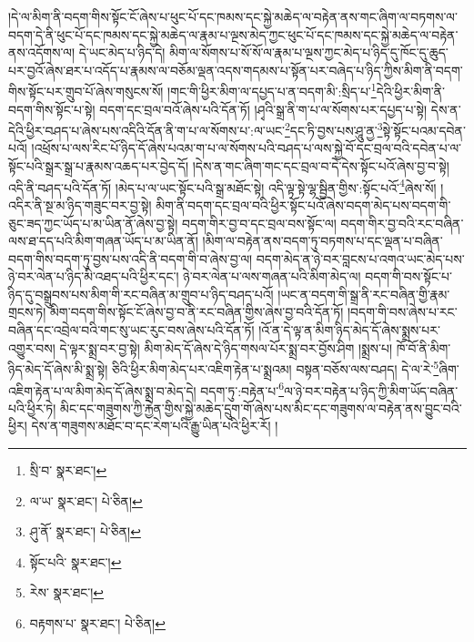 །དེ་ལ་མིག་ནི་བདག་གིས་སྟོང་ངོ་ཞེས་པ་ཕུང་པོ་དང་ཁམས་དང་སྐྱེ་མཆེད་ལ་བརྟེན་ནས་གང་ཞིག་ལ་བཏགས་ལ་བདག་དེ་ནི་ཕུང་པོ་དང་ཁམས་དང་སྐྱེ་མཆེད་ལ་རྣམ་པ་ལྔས་མེད་ཀྱང་ཕུང་པོ་དང་ཁམས་དང་སྐྱེ་མཆེད་ལ་བརྟེན་ནས་འདོགས་ལ། དེ་ཡང་མེད་པ་ཉིད་དེ། མིག་ལ་སོགས་པ་སོ་སོ་ལ་རྣམ་པ་ལྔས་ཀྱང་མེད་པ་ཉིད་དུ་ཁོང་དུ་ཆུད་པར་བྱའོ་ཞེས་ཐར་པ་འདོད་པ་རྣམས་ལ་བཅོམ་ལྡན་འདས་གདམས་པ་སྟོན་པར་བཞེད་པ་ཉིད་ཀྱིས་མིག་ནི་བདག་གིས་སྟོང་པར་གྲུབ་པོ་ཞེས་གསུངས་སོ། །གང་གི་ཕྱིར་མིག་ལ་དཔྱད་པ་ན་བདག་མི་:སྲིད་པ་\footnote{སྲི་བ་  སྣར་ཐང་། }དེའི་ཕྱིར་མིག་ནི་བདག་གིས་སྟོང་པ་སྟེ། བདག་དང་བྲལ་བའོ་ཞེས་པའི་དོན་ཏོ། །ཤྭའི་སྒྲ་ནི་ག་པ་ལ་སོགས་པར་དཔྱད་པ་སྟེ། དེས་ན་དེའི་ཕྱིར་བཤད་པ་ཞེས་པས་འདིའི་དོན་ནི་ག་པ་ལ་སོགས་པ་:ལ་ཡང་\footnote{ལ་ཡ་  སྣར་ཐང་།  པེ་ཅིན། }དང་ཏི་བྱས་པས་ཤཱུ་ནྱ་\footnote{ཤུ་ནོ་  སྣར་ཐང་།  པེ་ཅིན། }སྟེ་སྟོང་པའམ་དབེན་པའོ། །འཕྲོས་པ་ལས་རིང་པོ་ཉིད་དོ་ཞེས་པའམ་ག་པ་ལ་སོགས་པའི་བཤད་པ་ལས་སྐྱེ་བོ་དང་བྲལ་བའི་དབེན་པ་ལ་སྟོང་པའི་སྒྲར་སྒྲ་པ་རྣམས་འཆད་པར་བྱེད་དོ། །དེས་ན་གང་ཞིག་གང་དང་བྲལ་བ་དེ་དེས་སྟོང་པའོ་ཞེས་བྱ་བ་སྟེ། འདི་ནི་བཤད་པའི་དོན་ཏོ། །མེད་པ་ལ་ཡང་སྟོང་པའི་སྒྲ་མཐོང་སྟེ། འདི་ལྟ་སྟེ་ལྷ་སྦྱིན་གྱིས་:སྟོང་པའོ་\footnote{སྟོང་པའི་  སྣར་ཐང་། }ཞེས་སོ། །འདིར་ནི་སྔ་མ་ཉིད་གཟུང་བར་བྱ་སྟེ། མིག་ནི་བདག་དང་བྲལ་བའི་ཕྱིར་སྟོང་པའོ་ཞེས་བདག་མེད་པས་བདག་གི་ཅུང་ཟད་ཀྱང་ཡོད་པ་མ་ཡིན་ནོ་ཞེས་བྱ་སྟེ། བདག་གིར་བྱ་བ་དང་བྲལ་བས་སྟོང་ལ། བདག་གིར་བྱ་བའི་རང་བཞིན་ལས་ཐ་དད་པའི་མིག་གཞན་ཡོད་པ་མ་ཡིན་ནོ། །མིག་ལ་བརྟེན་ནས་བདག་ཏུ་བཏགས་པ་དང་ལྡན་པ་བཞིན་བདག་གིས་བདག་ཏུ་བྱས་པས་འདི་ནི་བདག་གི་བ་ཞེས་བྱ་ལ། བདག་མེད་ན་ཉེ་བར་བླངས་པ་འགའ་ཡང་མེད་པས་ཉེ་བར་ལེན་པ་ཉིད་མི་འཐད་པའི་ཕྱིར་དང་། ཉེ་བར་ལེན་པ་ལས་གཞན་པའི་མིག་མེད་ལ། བདག་གི་བས་སྟོང་པ་ཉིད་དུ་བསྒྲུབས་པས་མིག་གི་རང་བཞིན་མ་གྲུབ་པ་ཉིད་བཤད་པའོ། །ཡང་ན་བདག་གི་སྒྲ་ནི་རང་བཞིན་གྱི་རྣམ་གྲངས་ཏེ། མིག་བདག་གིས་སྟོང་ངོ་ཞེས་བྱ་བ་ནི་རང་བཞིན་གྱིས་ཞེས་བྱ་བའི་དོན་ཏོ། །བདག་གི་བས་ཞེས་པ་རང་བཞིན་དང་འབྲེལ་བའི་གང་སུ་ཡང་རུང་བས་ཞེས་པའི་དོན་ཏོ། །འོ་ན་དེ་ལྟ་ན་མིག་ཉིད་མེད་དོ་ཞེས་སྨྲས་པར་འགྱུར་བས། དེ་ལྟར་སྨྲ་བར་བྱ་སྟེ། མིག་མེད་དོ་ཞེས་དེ་ཉིད་གསལ་པོར་སྨྲ་བར་བྱོས་ཤིག །སྨྲས་པ། ཁོ་བོ་ནི་མིག་ཉིད་མེད་དོ་ཞེས་མི་སྨྲ་སྟེ། ཅིའི་ཕྱིར་མིག་མེད་པར་འཇིག་རྟེན་པ་སྨྲའམ། བསྟན་བཅོས་ལས་བཤད། དེ་ལ་རེ་\footnote{རེས་  སྣར་ཐང་། }ཞིག་འཇིག་རྟེན་པ་ལ་མིག་མེད་དོ་ཞེས་སྨྲ་བ་མེད་དེ། བདག་ཏུ་:བརྟེན་པ་\footnote{བརྟགས་པ་  སྣར་ཐང་།  པེ་ཅིན། }ལ་ཉེ་བར་བརྟེན་པ་ཉིད་ཀྱི་མིག་ཡོད་བཞིན་པའི་ཕྱིར་ཏེ། མིང་དང་གཟུགས་ཀྱི་རྐྱེན་གྱིས་སྐྱེ་མཆེད་དྲུག་གོ་ཞེས་པས་མིང་དང་གཟུགས་ལ་བརྟེན་ནས་བྱུང་བའི་ཕྱིར། དེས་ན་གཟུགས་མཐོང་བ་དང་རེག་པའི་རྒྱུ་ཡིན་པའི་ཕྱིར་རོ། །
